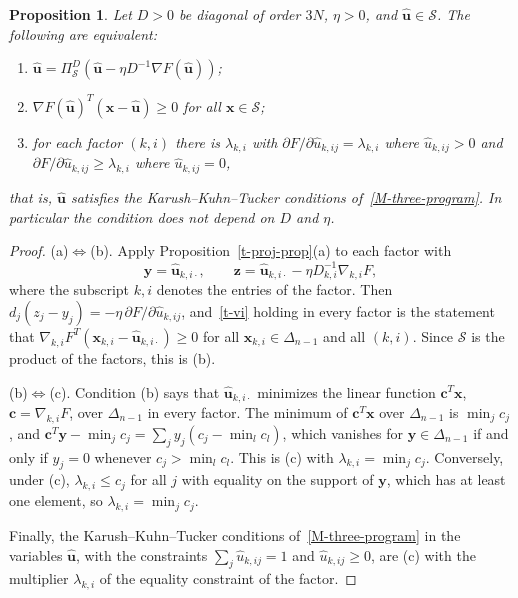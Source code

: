 \documentclass[11pt]{article}
\theoremstyle{plain}
\newtheorem{proposition}[theorem]{Proposition}
\theoremstyle{remark}
\numberwithin{equation}{section}
\begin{document}
\begin{proposition}\label{t-fixed}
Let $D>0$ be diagonal of order $3N$, $\eta>0$, and
$\widehat{\bm u}\in\mathcal{S}$. The following are equivalent:
\begin{enumerate}
\item[(a)] $\widehat{\bm u}=\Pi^D_{\mathcal{S}}\left(\widehat{\bm u}-\eta D^{-1}\nabla F\left(\widehat{\bm u}\right)\right)$;
\item[(b)] $\nabla F\left(\widehat{\bm u}\right)^T\left(\bm x-\widehat{\bm u}\right)\ge 0$ for all $\bm x\in\mathcal{S}$;
\item[(c)] for each factor $(k,i)$ there is $\lambda_{k,i}$ with
$\partial F/\partial\widehat u_{k,ij}=\lambda_{k,i}$ where $\widehat u_{k,ij}>0$
and $\partial F/\partial\widehat u_{k,ij}\ge\lambda_{k,i}$ where $\widehat u_{k,ij}=0$,
\end{enumerate}
that is, $\widehat{\bm u}$ satisfies the Karush--Kuhn--Tucker conditions
of~\eqref{M-three-program}. In particular the condition does not depend on $D$
and $\eta$.
\end{proposition}
\begin{proof}
(a)$\Leftrightarrow$(b). Apply Proposition~\ref{t-proj-prop}(a) to each factor
with
\begin{equation*}
\bm y=\widehat{\bm u}_{k,i\cdot},\qquad
\bm z=\widehat{\bm u}_{k,i\cdot}-\eta D_{k,i}^{-1}\nabla_{k,i}F,
\end{equation*}
where the subscript $k,i$ denotes the entries of the factor. Then
$d_j(z_j-y_j)=-\eta\,\partial F/\partial\widehat u_{k,ij}$, and~\eqref{t-vi}
holding in every factor is the statement that
$\nabla_{k,i}F^T(\bm x_{k,i}-\widehat{\bm u}_{k,i\cdot})\ge 0$ for all
$\bm x_{k,i}\in\Delta_{n-1}$ and all $(k,i)$. Since $\mathcal{S}$ is the
product of the factors, this is (b).

(b)$\Leftrightarrow$(c). Condition (b) says that $\widehat{\bm u}_{k,i\cdot}$
minimizes the linear function $\bm c^T\bm x$, $\bm c=\nabla_{k,i}F$, over
$\Delta_{n-1}$ in every factor. The minimum of $\bm c^T\bm x$ over
$\Delta_{n-1}$ is $\min_jc_j$, and
$\bm c^T\bm y-\min_jc_j=\sum_jy_j\left(c_j-\min_lc_l\right)$, which vanishes for
$\bm y\in\Delta_{n-1}$ if and only if $y_j=0$ whenever $c_j>\min_lc_l$. This
is (c) with $\lambda_{k,i}=\min_jc_j$. Conversely, under (c),
$\lambda_{k,i}\le c_j$ for all $j$ with equality on the support of $\bm y$,
which has at least one element, so $\lambda_{k,i}=\min_jc_j$.

Finally, the Karush--Kuhn--Tucker conditions of~\eqref{M-three-program} in the
variables $\widehat{\bm u}$, with the constraints $\sum_j\widehat u_{k,ij}=1$
and $\widehat u_{k,ij}\ge 0$, are (c) with the multiplier $\lambda_{k,i}$ of
the equality constraint of the factor.
\end{proof}
\end{document}
